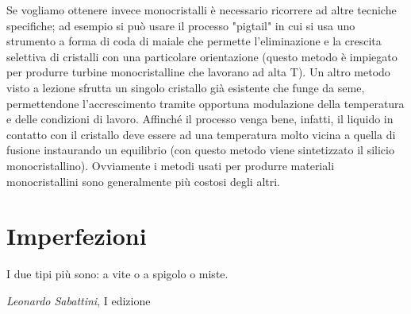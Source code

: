 Se vogliamo ottenere invece monocristalli è necessario ricorrere ad altre tecniche specifiche; ad esempio si può usare il processo "pigtail" in cui si usa uno strumento a forma di coda di maiale che permette l'eliminazione e la crescita selettiva di cristalli con una particolare orientazione (questo metodo è impiegato per produrre turbine monocristalline che lavorano ad alta T). Un altro metodo visto a lezione sfrutta un singolo cristallo già esistente che funge da seme, permettendone l'accrescimento tramite opportuna modulazione della temperatura e delle condizioni di lavoro. Affinché il processo venga bene, infatti, il liquido in contatto con il cristallo deve essere ad una temperatura molto vicina a quella di fusione instaurando un equilibrio (con questo metodo viene sintetizzato il silicio monocristallino). Ovviamente i metodi usati per produrre materiali monocristallini sono generalmente più costosi degli altri.

\section{Imperfezioni}

\epigraph{I due tipi più sono: a vite o a spigolo o miste.}{\textit{Leonardo Sabattini}, I edizione}


